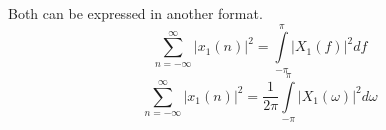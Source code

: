 Both  can be expressed in another format.
\begin{equation}\label{eq:FourierTransformProperties-ParsevalsTheorem-Frequency-Absolute}
  \sum\limits_{n=-\infty}^{\infty} \lvert x_{1}(n) \rvert^{2} = \int\limits_{-\pi}^{\pi} \lvert X_{1}(f) \rvert^{2} df
\end{equation}
\begin{equation}\label{eq:FourierTransformProperties-ParsevalsTheorem-Omega-Absolute}
  \sum\limits_{n=-\infty}^{\infty} \lvert x_{1}(n) \rvert^{2} = \frac{1}{2 \pi} \int\limits_{-\pi}^{\pi} \lvert X_{1}(\omega) \rvert^{2} d\omega
\end{equation}
